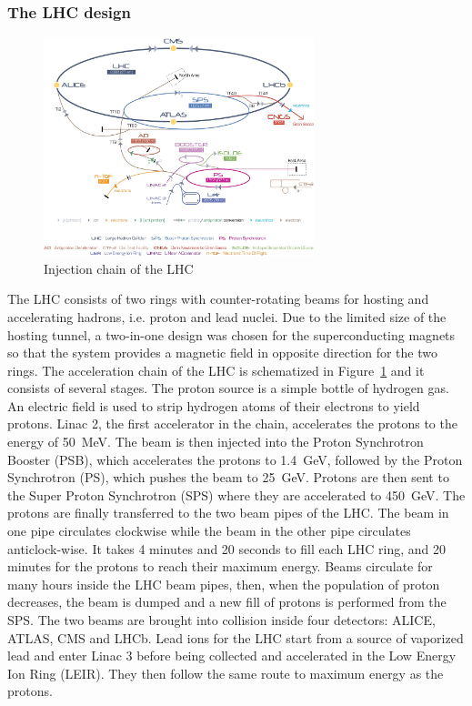 \subsubsection{The LHC design}
\begin{figure}
\centering
\includegraphics[width=0.7\textwidth]{Images/atlas/lhc_injectors.png}
\caption{Injection chain of the LHC}
\label{fig:lhc_inj}
\end{figure}
The LHC consists of two rings with counter-rotating beams for hosting and accelerating hadrons, i.e. proton and lead nuclei. Due to the limited size of the hosting tunnel, a two-in-one design was chosen for the superconducting magnets so that the system provides a magnetic field in opposite direction for the two rings.
The acceleration chain of the LHC is schematized in Figure~\ref{fig:lhc_inj} and it consists of several stages. The proton source is a simple bottle of hydrogen gas. An electric field is used to strip hydrogen atoms of their electrons to yield protons. Linac 2, the first accelerator in the chain, accelerates the protons to the energy of \SI{50}{\MeV}. The beam is then injected into the Proton Synchrotron Booster (PSB), which accelerates the protons to \SI{1.4}{\GeV}, followed by the Proton Synchrotron (PS), which pushes the beam to \SI{25}{\GeV}. Protons are then sent to the Super Proton Synchrotron (SPS) where they are accelerated to \SI{450}{\GeV}.
The protons are finally transferred to the two beam pipes of the LHC. The beam in one pipe circulates clockwise while the beam in the other pipe circulates anticlock-wise. It takes 4 minutes and 20 seconds to fill each LHC ring, and 20 minutes for the protons to reach their maximum energy. Beams circulate for many hours inside the LHC beam pipes, then, when the population of proton decreases, the beam is dumped and a new fill of protons is performed from the SPS. The two beams are brought into collision inside four detectors: ALICE, ATLAS, CMS and LHCb. Lead ions for the LHC start from a source of vaporized lead and enter Linac 3 before being collected and accelerated in the Low Energy Ion Ring (LEIR). They then follow the same route to maximum energy as the protons.
